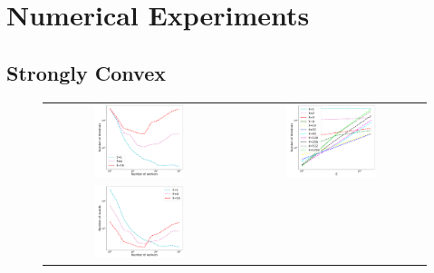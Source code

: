 


\section{Numerical Experiments}



\subsection{Strongly Convex}

\begin{figure}[h!]
\centering
\begin{tabular}{cc}
	\includegraphics[width=0.5\textwidth]{fig/E1-4-16speedupNodesT-min-w8a-epsilon013-b4-reg1e-05-adapt0.pdf} & 
\includegraphics[width=0.5\textwidth]{fig/E1-4-16speedupEpochsT-min-w8a-epsilon013-b4-reg1e-05-adapt0.pdf} \\
	\includegraphics[width=0.5\textwidth]{fig/E1-4-16speedupNodesRounds-w8a-epsilon013-b4-reg1e-05-adapt0.pdf} & 

\end{tabular}
\end{figure}
